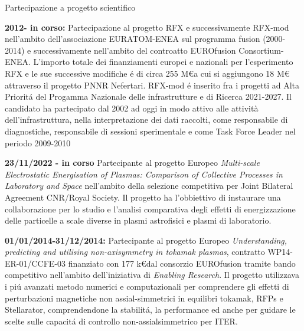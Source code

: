 \begin{statementblock}{Partecipazione a progetto scientifico}
\end{statementblock}
\begin{enumerate}[label={[G\arabic*]}]
\item \textbf{2012- in corso:} Partecipazione al progetto RFX e successivamente
  RFX-mod nell'ambito dell'associazione EURATOM-ENEA sul programma
  fusion (2000-2014) e successivamente nell'ambito del controatto
  EUROfusion Consortium-ENEA. L'importo totale dei finanziamenti
  europei e nazionali per l'esperimento RFX e le sue successive
  modifiche \'e di circa 255 M\euro a cui si aggiungono 18 M\euro
  attraverso il progetto PNNR Nefertari. RFX-mod \'e inserito fra i
  progetti ad Alta Priorit\'a del Progamma Nazionale delle
  infrastrutture e di Ricerca 2021-2027. Il candidato ha partecipato
  dal 2002 ad oggi in modo attivo alle attività dell’infrastruttura,
  nella interpretazione dei dati raccolti, come responsabile di
  diagnostiche, responsabile di sessioni sperimentale e come Task
  Force Leader nel periodo 2009-2010
\item \textbf{23/11/2022 - in corso}  Partecipante al progetto Europeo
  \emph{Multi-scale Electrostatic Energisation of Plasmas: Comparison
    of Collective Processes in Laboratory and Space} nell'ambito della
  selezione competitiva per Joint Bilateral Agreement CNR/Royal
  Society. Il progetto ha l'obbiettivo di instaurare una
  collaborazione per lo studio e l'analisi comparativa degli effetti
  di energizzazione delle particelle a scale diverse in plasmi
  astrofisici e plasmi di laboratorio.

\item \textbf{01/01/2014-31/12/2014:} Partecipante al progetto Europeo
  \emph{Understanding, predicting and utilising non-axisymmetry in tokamak plasmas},
  contratto WP14-ER-01/CCFE-03 finanziato con 177 k\euro dal
  consorzio EUROfusion tramite bando competitivo nell'ambito
  dell'iniziativa di \emph{Enabling Research}. Il progetto utilizzava
  i pi{\'u} avanzati metodo numerici e computazionali per comprendere
  gli effetti di perturbazioni magnetiche non assial-simmetrici in
  equilibri tokamak, RFPs e Stellarator, comprendendone la
  stabilit{\'a}, la performance ed anche per guidare le scelte sulle
  capacit{\'a} di controllo non-assialsimmetrico per ITER. 


\end{enumerate}

